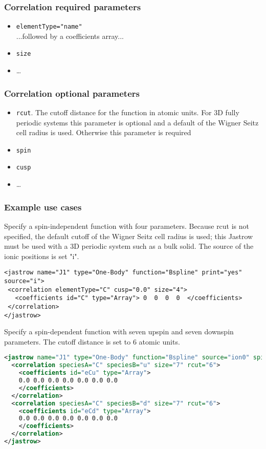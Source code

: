 \subsubsection{Correlation required parameters}
\begin{itemize}
\item \texttt{elementType="name"}\\
...followed by a coefficients array...
\item \texttt{size}
\item \ldots
\end{itemize}
\subsubsection{Correlation optional parameters}
\begin{itemize}
\item \texttt{rcut}. The cutoff distance for the function in atomic units. For 3D fully periodic systems this parameter is optional and a default of the Wigner Seitz cell radius is used. Otherwise this parameter is required
\item \texttt{spin}
\item \texttt{cusp}
\item \ldots
\end{itemize}

\subsubsection{Example use cases}
Specify a spin-independent function with four parameters. Because rcut  is not specified, the default cutoff of the Wigner Seitz cell radius is used; this Jastrow must be used with a 3D periodic system such as a bulk solid. The source of the ionic positions is set "i".
\begin{lstlisting}
<jastrow name="J1" type="One-Body" function="Bspline" print="yes" source="i">
 <correlation elementType="C" cusp="0.0" size="4">
   <coefficients id="C" type="Array"> 0  0  0  0  </coefficients>
 </correlation>
</jastrow>
\end{lstlisting}

Specify a spin-dependent function with seven upspin and seven downspin parameters. The cutoff distance is set to 6 atomic units.
\begin{lstlisting}[language=xml]
<jastrow name="J1" type="One-Body" function="Bspline" source="ion0" spin="yes">
  <correlation speciesA="C" speciesB="u" size="7" rcut="6">
    <coefficients id="eCu" type="Array"> 
    0.0 0.0 0.0 0.0 0.0 0.0 0.0
    </coefficients>
  </correlation>
  <correlation speciesA="C" speciesB="d" size="7" rcut="6">
    <coefficients id="eCd" type="Array"> 
    0.0 0.0 0.0 0.0 0.0 0.0 0.0
    </coefficients>
  </correlation>
</jastrow>
\end{lstlisting}
